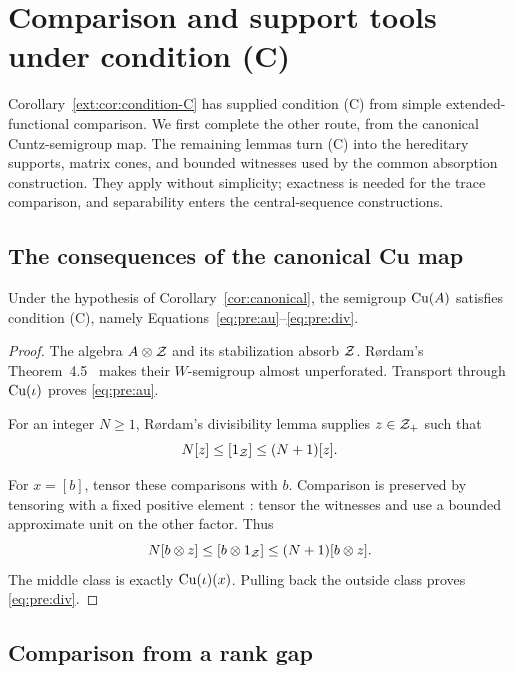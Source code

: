 \section{Comparison and support tools under condition (C)}
\label{sec:support-tools}

Corollary~\ref{ext:cor:condition-C} has supplied condition (C) from
simple extended-functional comparison. We first complete the other
route, from the canonical Cuntz-semigroup map. The remaining lemmas turn
(C) into the hereditary supports, matrix cones, and bounded witnesses
used by the common absorption construction. They apply without
simplicity; exactness is needed for the trace comparison, and
separability enters the central-sequence constructions.

\subsection{The consequences of the canonical Cu map}

\begin{lemma}
\label{lem:C}
Under the hypothesis of Corollary~\ref{cor:canonical}, the semigroup
$\mathrm{Cu}(A)$ satisfies condition \textup{(C)}, namely
Equations~\eqref{eq:pre:au}--\eqref{eq:pre:div}.
\end{lemma}

\begin{proof}
The algebra \(A\otimes\mathcal Z\) and its stabilization absorb \(\mathcal Z\).
R{\o}rdam's Theorem~4.5~\cite{Rordam2004} makes their \(W\)-semigroup
almost unperforated. Transport through \(\mathrm{Cu}(\iota)\) proves
\eqref{eq:pre:au}.

For an integer $N\ge1$, R\o rdam's divisibility lemma
\cite[Lemma~4.2]{Rordam2004} supplies $z\in\mathcal Z_+$ such that
\[
 N[z]\le[1_{\mathcal Z}]\le(N+1)[z].
\]

For \(x=[b]\), tensor these comparisons with \(b\). Comparison is
preserved by tensoring with a fixed positive element
\cite[Lemma~4.1]{Rordam2004}: tensor the witnesses and use a bounded
approximate unit on the other factor.
Thus
\[
 N[b\otimes z]\le[b\otimes1_{\mathcal Z}]
       \le(N+1)[b\otimes z].
\]
The middle class is exactly \(\mathrm{Cu}(\iota)(x)\). Pulling back the
outside class proves \eqref{eq:pre:div}.
\end{proof}

\subsection{Comparison from a rank gap}

